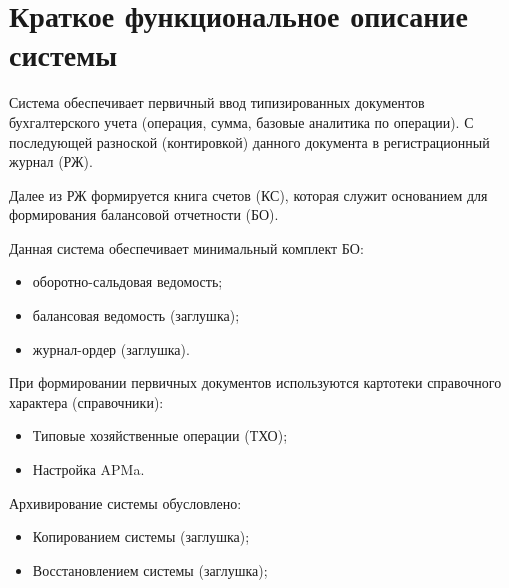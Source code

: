 \section{Краткое функциональное описание системы}

Система обеспечивает первичный ввод типизированных документов бухгалтерского учета
(операция, сумма, базовые аналитика по операции).
С последующей разноской (контировкой) данного документа в регистрационный журнал (РЖ). 

Далее из РЖ формируется книга счетов (КС),
которая служит основанием для формирования балансовой отчетности (БО).

Данная система обеспечивает минимальный комплект БО:
\begin{itemize}
    \item оборотно-сальдовая ведомость;
    \item балансовая ведомость (заглушка);
    \item журнал-ордер (заглушка).
\end{itemize}

При формировании первичных документов используются картотеки справочного характера (справочники):
\begin{itemize}
    \item Типовые хозяйственные операции (ТХО);
    \item Настройка APMa.
\end{itemize}

Архивирование системы обусловлено:
\begin{itemize}
    \item Копированием системы (заглушка);
    \item Восстановлением системы (заглушка);
\end{itemize}

\newpage
